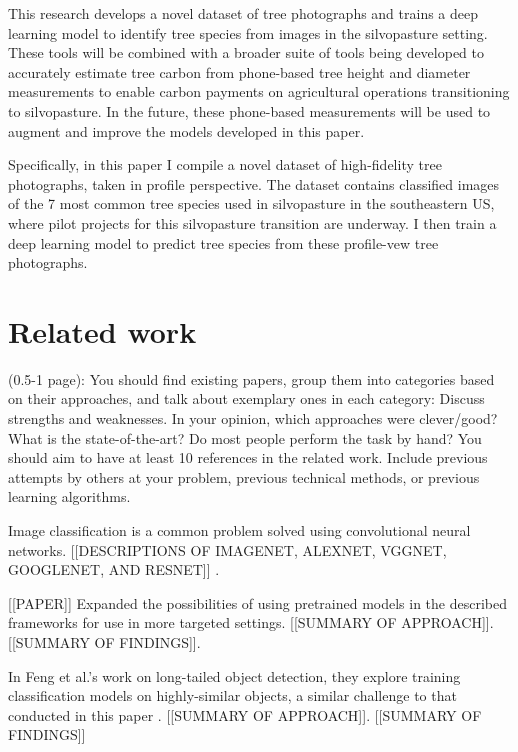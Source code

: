 \documentclass[10pt,twocolumn,letterpaper]{article}
\begin{document}
This research develops a novel dataset of tree photographs and trains a deep learning model to identify tree species from images in the silvopasture setting. These tools will be combined with a broader suite of tools being developed to accurately estimate tree carbon from phone-based tree height and diameter measurements to enable carbon payments on agricultural operations transitioning to silvopasture. In the future, these phone-based measurements will be used to augment and improve the models developed in this paper.

Specifically, in this paper I compile a novel dataset of high-fidelity tree photographs, taken in profile perspective. The dataset contains classified images of the 7 most common tree species used in silvopasture in the southeastern US, where pilot projects for this silvopasture transition are underway. I then train a deep learning model to predict tree species from these profile-vew tree photographs.

\section{Related work}
\label{sec:litreview}

{(0.5-1 page): You should find existing papers, group them into categories based on their approaches, and talk about exemplary ones in each category: Discuss strengths and weaknesses. In your opinion, which approaches were clever/good? What is the state-of-the-art? Do most people perform the task by hand? You should aim to have at least 10 references in the related work. Include previous attempts by others at your problem, previous technical methods, or previous learning algorithms.}

Image classification is a common problem solved using convolutional neural networks. [[DESCRIPTIONS OF IMAGENET, ALEXNET, VGGNET, GOOGLENET, AND RESNET]] \cite{VGGNet, GoogLeNET, ResNET}. 

[[PAPER]] Expanded the possibilities of using pretrained models in the described frameworks for use in more targeted settings. [[SUMMARY OF APPROACH]]. [[SUMMARY OF FINDINGS]].

In Feng et al.'s work on long-tailed object detection, they explore training classification models on highly-similar objects, a similar challenge to that conducted in this paper \cite{Feng_2021_ICCV}.  [[SUMMARY OF APPROACH]]. [[SUMMARY OF FINDINGS]]
\end{document}
